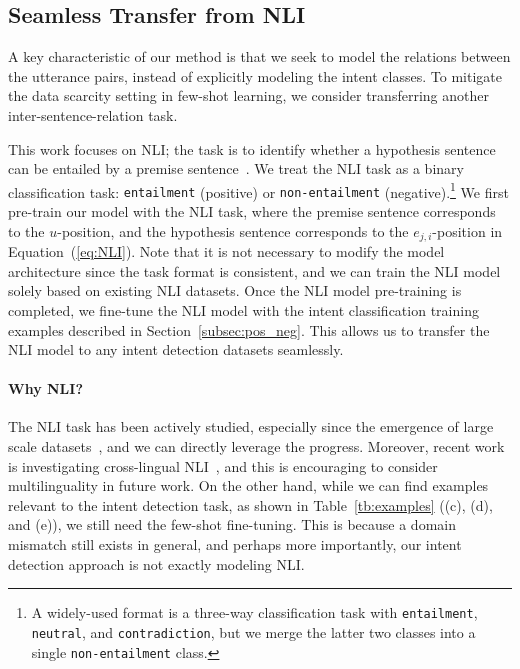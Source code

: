 \subsection{Seamless Transfer from NLI}
\label{subsec:nli_transfer}

A key characteristic of our method is that we seek to model the relations between the utterance pairs, instead of explicitly modeling the intent classes.
To mitigate the data scarcity setting in few-shot learning, we consider transferring another inter-sentence-relation task.

This work focuses on NLI; the task is to identify whether a hypothesis sentence can be entailed by a premise sentence~\citep{deep-nli}.
We treat the NLI task as a binary classification task: {\tt entailment} (positive) or {\tt non-entailment} (negative).\footnote{A widely-used format is a three-way classification task with {\tt entailment}, {\tt neutral}, and {\tt contradiction}, but we merge the latter two classes into a single {\tt non-entailment} class.}
We first pre-train our model with the NLI task, where the premise sentence corresponds to the $u$-position, and the hypothesis sentence corresponds to the $e_{j, i}$-position in Equation~(\ref{eq:NLI}).
Note that it is not necessary to modify the model architecture since the task format is consistent, and we can train the NLI model solely based on existing NLI datasets.
Once the NLI model pre-training is completed, we fine-tune the NLI model with the intent classification training examples described in Section~\ref{subsec:pos_neg}.
This allows us to transfer the NLI model to any intent detection datasets seamlessly.

\paragraph{Why NLI?}
The NLI task has been actively studied, especially since the emergence of large scale datasets~\citep{snli,mnli}, and we can directly leverage the progress.
Moreover, recent work is investigating cross-lingual NLI~\citep{eriguchi-crosslingual,xnli}, and this is encouraging to consider multilinguality in future work.
On the other hand, while we can find examples relevant to the intent detection task, as shown in Table~\ref{tb:examples} ((c), (d), and (e)), we still need the few-shot fine-tuning.
This is because a domain mismatch still exists in general, and perhaps more importantly, our intent detection approach is not exactly modeling NLI.

